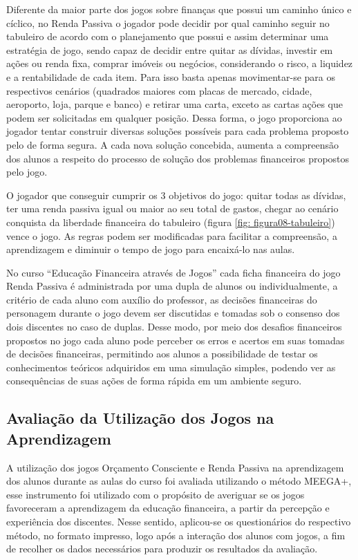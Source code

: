 Diferente da maior parte dos jogos sobre finanças que possui um caminho único e cíclico, no Renda Passiva o jogador pode decidir por qual caminho seguir no tabuleiro de acordo com o planejamento que possui e assim determinar uma estratégia de jogo, sendo capaz de decidir entre quitar as dívidas, investir em ações ou renda fixa, comprar imóveis ou negócios, considerando o risco, a liquidez e a rentabilidade de cada item. Para isso basta apenas movimentar-se para os respectivos cenários (quadrados maiores com placas de mercado, cidade, aeroporto, loja, parque e banco) e retirar uma carta, exceto as cartas ações que podem ser solicitadas em qualquer posição. Dessa forma, o jogo proporciona ao jogador tentar construir diversas soluções possíveis para cada problema proposto pelo de forma segura. A cada nova solução concebida, aumenta a compreensão dos alunos a respeito do processo de solução dos problemas financeiros propostos pelo jogo.

O jogador que conseguir cumprir os 3 objetivos do jogo: quitar todas as dívidas, ter uma renda passiva igual ou maior ao seu total de gastos, chegar ao cenário conquista da liberdade financeira do tabuleiro (figura \ref{fig: figura08-tabuleiro}) vence o jogo. As regras podem ser modificadas para facilitar a compreensão, a aprendizagem e diminuir o tempo de jogo para encaixá-lo nas aulas.

No curso “Educação Financeira através de Jogos” cada ficha financeira do jogo Renda Passiva é administrada por uma dupla de alunos ou individualmente, a critério de cada aluno com auxílio do professor, as decisões financeiras do personagem durante o jogo devem ser discutidas e tomadas sob o consenso dos dois discentes no caso de duplas. Desse modo, por meio dos desafios financeiros propostos no jogo cada aluno pode perceber os erros e acertos em suas tomadas de decisões financeiras, permitindo aos alunos a possibilidade de testar os conhecimentos teóricos adquiridos em uma simulação simples, podendo ver as consequências de suas ações de forma rápida em um ambiente seguro.

\subsection{Avaliação da Utilização dos Jogos na Aprendizagem}
A utilização dos jogos Orçamento Consciente e Renda Passiva na aprendizagem dos alunos durante as aulas do curso foi avaliada utilizando o método MEEGA+, esse instrumento foi utilizado com o propósito de averiguar se os jogos favoreceram a aprendizagem da educação financeira, a partir da percepção e experiência dos discentes. Nesse sentido, aplicou-se os questionários do respectivo método, no formato impresso, logo após a interação dos alunos com jogos, a fim de recolher os dados necessários para produzir os resultados da avaliação.

